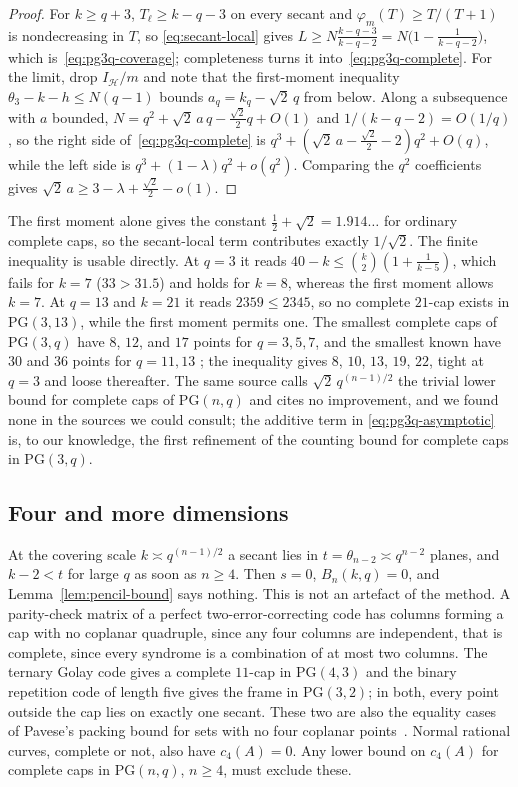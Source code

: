 \documentclass[11pt]{article}
\theoremstyle{definition}
\theoremstyle{remark}
\newcommand{\PG}{\mathrm{PG}}
\newcommand{\cH}{\mathcal{H}}
\newcommand{\IH}{I_{\cH}}
\begin{document}
\begin{proof}
For $k\ge q+3$, $T_\ell\ge k-q-3$ on every secant and
$\varphi_m(T)\ge T/(T+1)$ is nondecreasing in $T$, so
\eqref{eq:secant-local} gives
$L\ge N\frac{k-q-3}{k-q-2}=N\bigl(1-\frac1{k-q-2}\bigr)$,
which is~\eqref{eq:pg3q-coverage}; completeness turns it
into~\eqref{eq:pg3q-complete}.  For the limit, drop $\IH/m$ and note that
the first-moment inequality $\theta_3-k-h\le N(q-1)$ bounds
$a_q=k_q-\sqrt2\,q$ from below.  Along a subsequence with $a$ bounded,
$N=q^2+\sqrt2\,a\,q-\frac{\sqrt2}2q+O(1)$ and $1/(k-q-2)=O(1/q)$, so
the right side of~\eqref{eq:pg3q-complete} is
$q^3+(\sqrt2\,a-\frac{\sqrt2}2-2)q^2+O(q)$, while the left side is
$q^3+(1-\lambda)q^2+o(q^2)$.  Comparing the $q^2$ coefficients gives
$\sqrt2\,a\ge3-\lambda+\frac{\sqrt2}2-o(1)$.
\end{proof}

The first moment alone gives the constant $\frac12+\sqrt2=1.914\ldots$
for ordinary complete caps, so the secant-local term contributes exactly
$1/\sqrt2$.  The finite inequality is usable directly.  At $q=3$ it reads
$40-k\le\binom{k}{2}(1+\frac1{k-5})$, which fails for $k=7$ ($33>31.5$)
and holds for $k=8$, whereas the first moment allows $k=7$.  At $q=13$
and $k=21$ it reads $2359\le2345$, so no complete $21$-cap exists in
$\PG(3,13)$, while the first moment permits one.  The smallest complete
caps of $\PG(3,q)$ have $8$, $12$, and $17$ points for $q=3,5,7$, and the
smallest known have $30$ and $36$ points for $q=11,13$
\cite{BartoliDavydovKreshchukMarcuginiPambianco2016}; the inequality
gives $8$, $10$, $13$, $19$, $22$, tight at $q=3$ and loose thereafter.
The same source calls $\sqrt2\,q^{(n-1)/2}$ the trivial lower bound for
complete caps of $\PG(n,q)$ and cites no improvement, and we found none
in the sources we could consult; the additive term in
\eqref{eq:pg3q-asymptotic} is, to our knowledge, the first refinement of
the counting bound for complete caps in $\PG(3,q)$.

\subsection{Four and more dimensions}

At the covering scale $k\asymp q^{(n-1)/2}$ a secant lies in
$t=\theta_{n-2}\asymp q^{n-2}$ planes, and $k-2<t$ for large $q$ as soon
as $n\ge4$.  Then $s=0$, $B_n(k,q)=0$, and Lemma~\ref{lem:pencil-bound}
says nothing.  This is not an artefact of the method.  A parity-check
matrix of a perfect two-error-correcting code has columns forming a cap
with no coplanar quadruple, since any four columns are independent, that
is complete, since every syndrome is a combination of at most two columns.
The ternary Golay code gives a complete $11$-cap in $\PG(4,3)$ and the
binary repetition code of length five gives the frame in $\PG(3,2)$; in
both, every point outside the cap lies on exactly one secant.  These two
are also the equality cases of Pavese's packing bound for sets with no four
coplanar points~\cite[Proposition~3.1]{Pavese2023}.  Normal rational
curves, complete or not, also have $c_4(A)=0$.  Any lower bound
on $c_4(A)$ for complete caps in $\PG(n,q)$, $n\ge4$, must exclude these.
\end{document}
